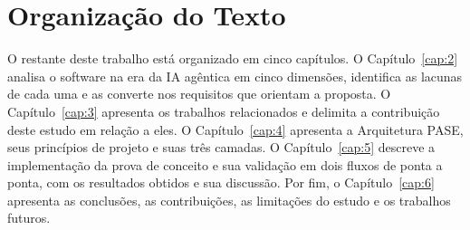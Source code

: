 \section{Organização do Texto}\label{sec:1.4}

O restante deste trabalho está organizado em cinco capítulos. O Capítulo~\ref{cap:2} analisa o software na era da IA agêntica em cinco dimensões, identifica as lacunas de cada uma e as converte nos requisitos que orientam a proposta. O Capítulo~\ref{cap:3} apresenta os trabalhos relacionados e delimita a contribuição deste estudo em relação a eles. O Capítulo~\ref{cap:4} apresenta a Arquitetura PASE, seus princípios de projeto e suas três camadas. O Capítulo~\ref{cap:5} descreve a implementação da prova de conceito e sua validação em dois fluxos de ponta a ponta, com os resultados obtidos e sua discussão. Por fim, o Capítulo~\ref{cap:6} apresenta as conclusões, as contribuições, as limitações do estudo e os trabalhos futuros.
